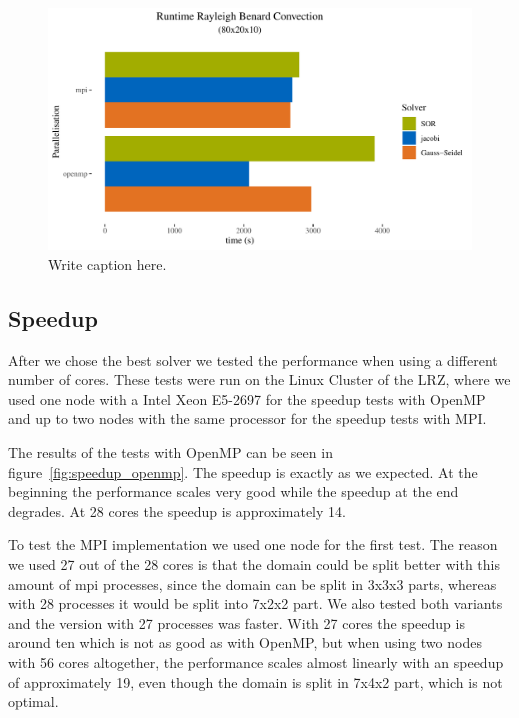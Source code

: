 \documentclass{article}%
\begin{document}
\begin{figure}[htb]
\centering
\includegraphics[width=1\linewidth]{../tests/graphs/runtime_rayleigh_benard_convection_8-2-1_solver.pdf}
\caption{Write caption here.}
\label{fig:solver}
\end{figure}


\subsection{Speedup}
After we chose the best solver we tested the performance when using a different number of cores. These tests were run on the Linux Cluster of the LRZ, where we used one node with a Intel Xeon E5-2697 for the speedup tests with OpenMP and up to two nodes with the same processor for the speedup tests with MPI.

The results of the tests with OpenMP can be seen in figure~\ref{fig:speedup_openmp}. The speedup is exactly as we expected. At the beginning the performance scales very good while the speedup at the end degrades. At 28 cores the speedup is approximately 14.

To test the MPI implementation we used one node for the first test. The reason we used 27 out of the 28 cores is that the domain could be split better with this amount of mpi processes, since the domain can be split in 3x3x3 parts, whereas with 28 processes it would be split into 7x2x2 part. We also tested both variants and the version with 27 processes was faster. With 27 cores the speedup is around ten which is not as good as with OpenMP, but when using two nodes with 56 cores altogether, the performance scales almost linearly with an speedup of approximately 19, even though the domain is split in 7x4x2 part, which is not optimal.
\end{document}
